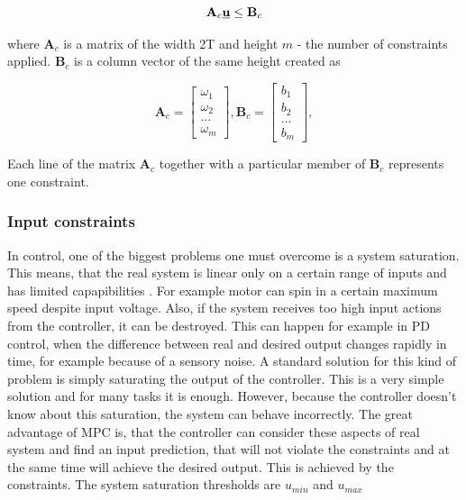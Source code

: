 \documentclass{article}
\begin{document}
\begin{equation}
\label{eq:MPC_cond}
\textbf{A}_c \textbf{\underline{u}} \leq \textbf{B}_c
\end{equation}


where $\textbf{A}_c$ is a matrix of the width 2T and height $m$ - the number of constraints applied. $\textbf{B}_c$ is a column vector of the same height created as

\begin{equation}
\textbf{A}_c =
  \begin{bmatrix}
  \omega_1 \\
  \omega_2 \\
  ...	   \\
  \omega_m
  \end{bmatrix},\textbf{B}_c = \begin{bmatrix}
  b_1 \\
  b_2 \\
  ... \\
  b_m
  \end{bmatrix}, 
\end{equation}

Each line of the matrix $\textbf{A}_c$ together with a particular member of $\textbf{B}_c$ represents one constraint. 

\subsubsection{Input constraints}
In control, one of the biggest problems one must overcome is a system saturation. This means, that the real system is linear only on a certain range of inputs and has limited capapibilities \cite{saturation}. For example motor can spin in a certain maximum speed despite input voltage. Also, if the system receives too high input actions from the controller, it can be destroyed. This can happen for example in PD control, when the difference between real and desired output changes rapidly in time, for example because of a sensory noise.
A standard  solution for this kind of problem is simply saturating the output of the controller. This is a very simple solution and for many tasks it is enough. However, because the controller doesn't know about this saturation, the system can behave incorrectly.
The great advantage of MPC is, that the controller can consider these aspects of real system and find an input prediction, that will not violate the constraints and at the same time will achieve the desired output. This is achieved by the constraints. The system saturation thresholds are $u_{min}$ and $u_{max}$
\end{document}
